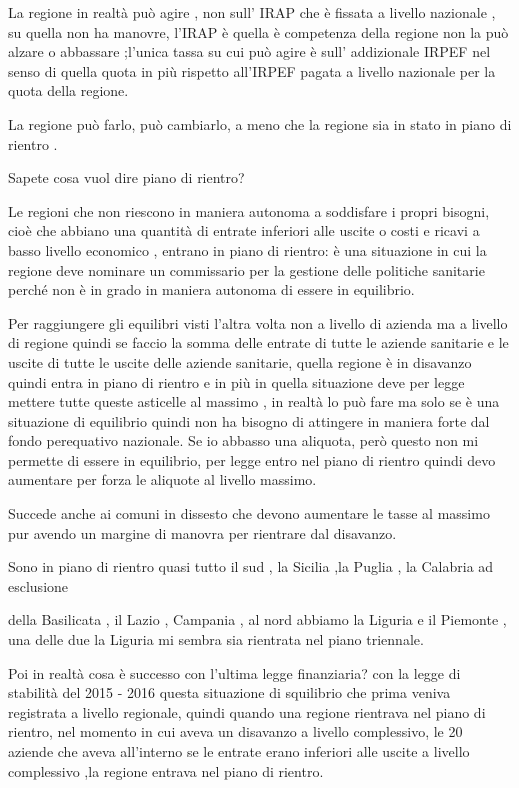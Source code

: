 \documentclass[]{article}
\begin{document}
La regione in realtà può agire , non sull' IRAP che è fissata a livello
nazionale , su quella non ha manovre, l'IRAP è quella è competenza della
regione non la può alzare o abbassare ;l'unica tassa su cui può agire è
sull' addizionale IRPEF nel senso di quella quota in più rispetto
all'IRPEF pagata a livello nazionale per la quota della regione.

La regione può farlo, può cambiarlo, a meno che la regione sia in stato
in piano di rientro .

Sapete cosa vuol dire piano di rientro?

Le regioni che non riescono in maniera autonoma a soddisfare i propri
bisogni, cioè che abbiano una quantità di entrate inferiori alle uscite
o costi e ricavi a basso livello economico , entrano in piano di
rientro: è una situazione in cui la regione deve nominare un commissario
per la gestione delle politiche sanitarie perché non è in grado in
maniera autonoma di essere in equilibrio.

Per raggiungere gli equilibri visti l'altra volta non a livello di
azienda ma a livello di regione quindi se faccio la somma delle entrate
di tutte le aziende sanitarie e le uscite di tutte le uscite delle
aziende sanitarie, quella regione è in disavanzo quindi entra in piano
di rientro e in più in quella situazione deve per legge mettere tutte
queste asticelle al massimo , in realtà lo può fare ma solo se è una
situazione di equilibrio quindi non ha bisogno di attingere in maniera
forte dal fondo perequativo nazionale. Se io abbasso una aliquota, però
questo non mi permette di essere in equilibrio, per legge entro nel
piano di rientro quindi devo aumentare per forza le aliquote al livello
massimo.

Succede anche ai comuni in dissesto che devono aumentare le tasse al
massimo pur avendo un margine di manovra per rientrare dal disavanzo.

Sono in piano di rientro quasi tutto il sud , la Sicilia ,la Puglia , la
Calabria ad esclusione

della Basilicata , il Lazio , Campania , al nord abbiamo la Liguria e il
Piemonte , una delle due la Liguria mi sembra sia rientrata nel piano
triennale.

Poi in realtà cosa è successo con l'ultima legge finanziaria? con la
legge di stabilità del 2015 - 2016 questa situazione di squilibrio che
prima veniva registrata a livello regionale, quindi quando una regione
rientrava nel piano di rientro, nel momento in cui aveva un disavanzo a
livello complessivo, le 20 aziende che aveva all'interno se le entrate
erano inferiori alle uscite a livello complessivo ,la regione entrava
nel piano di rientro.
\end{document}
